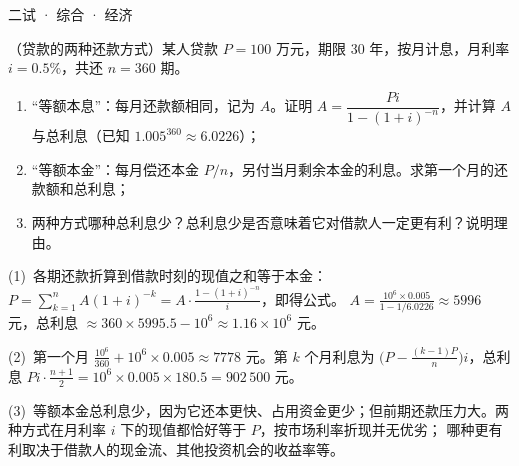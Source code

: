 \documentclass[cjk=noto, seal=first]{mojing-exam}
\begin{document}
\begin{paper}[time={建议 1.5 小时（训练设置）}, full=100]{二试 · 综合 · 经济}
\begin{questions}
\question[25]
（贷款的两种还款方式）某人贷款 $P=100$ 万元，期限 30 年，按月计息，月利率 $i=0.5\%$，共还 $n=360$ 期。
\begin{enumerate}
  \item “等额本息”：每月还款额相同，记为 $A$。证明 $A=\dfrac{Pi}{1-(1+i)^{-n}}$，并计算 $A$ 与总利息（已知 $1.005^{360}\approx6.0226$）；
  \item “等额本金”：每月偿还本金 $P/n$，另付当月剩余本金的利息。求第一个月的还款额和总利息；
  \item 两种方式哪种总利息少？总利息少是否意味着它对借款人一定更有利？说明理由。
\end{enumerate}
\answerspace{2cm}
\begin{solution}
(1)~各期还款折算到借款时刻的现值之和等于本金：$P=\sum_{k=1}^nA(1+i)^{-k}=A\cdot\frac{1-(1+i)^{-n}}{i}$，即得公式。
$A=\frac{10^6\times0.005}{1-1/6.0226}\approx5996$ 元，总利息 $\approx360\times5995.5-10^6\approx1.16\times10^6$ 元。

(2)~第一个月 $\frac{10^6}{360}+10^6\times0.005\approx7778$ 元。第 $k$ 个月利息为 $\bigl(P-\frac{(k-1)P}n\bigr)i$，总利息
$Pi\cdot\frac{n+1}2=10^6\times0.005\times180.5=902\,500$ 元。

(3)~等额本金总利息少，因为它还本更快、占用资金更少；但前期还款压力大。两种方式在月利率 $i$ 下的现值都恰好等于 $P$，按市场利率折现并无优劣；
哪种更有利取决于借款人的现金流、其他投资机会的收益率等。
\end{solution}


\end{questions}
\end{paper}
\end{document}
